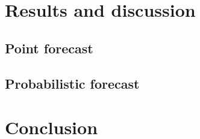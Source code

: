 \documentclass[
  authoryear,
  preprint,
  3p]{elsarticle}
\begin{document}
\hypertarget{sec-result}{%
\section{Results and discussion}\label{sec-result}}

\hypertarget{point-forecast}{%
\subsection{Point forecast}\label{point-forecast}}

\hypertarget{probabilistic-forecast}{%
\subsection{Probabilistic forecast}\label{probabilistic-forecast}}

\hypertarget{sec-conclusion}{%
\section{Conclusion}\label{sec-conclusion}}


\renewcommand\refname{References}
  
\end{document}
